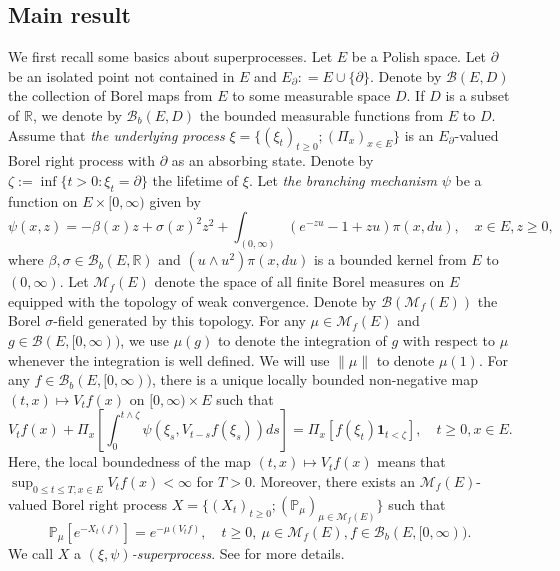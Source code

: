 \documentclass[12pt,a4paper]{amsart}
\numberwithin{equation}{section}
\theoremstyle{plain}
\theoremstyle{definition}
\theoremstyle{remark}
\begin{document}
\subsection{Main result} \label{sec:super}

	We first recall some basics about superprocesses.
	Let $E$ be a Polish space.
    Let $\partial$ be an isolated point not contained in $E$ and $E_\partial: = E \cup \{\partial\}$.
	Denote by $\mathcal B(E, D)$ the collection of Borel maps  from $E$ to some measurable space $D$.
    If $D$ is a subset of $\mathbb R$, we denote by $\mathcal B_b(E,D)$ the bounded measurable functions from $E$ to $D$.
	Assume that \emph{the underlying process} $\xi = \{(\xi_t)_{t\ge0}; (\Pi_x)_{x\in E}\}$ is an $E_\partial$-valued Borel right process with $\partial$ as an
    absorbing state.
	Denote by $\zeta:=\inf\{t>0: \xi_t=\partial\}$ the lifetime of $\xi$.
	Let \emph{the branching mechanism} $\psi$ be a function on $E \times [0,\infty)$ given by
\begin{equation}
	\psi(x,z)
	= -\beta(x) z + \sigma(x)^2 z^2 + \int_{(0,\infty)} (e^{-zu} -1 + zu) \pi(x,du),
	\quad x\in E, z\geq 0,
\end{equation}
	where $\beta, \sigma \in \mathcal B_b(E,\mathbb R)$ and $(u \wedge u^2) \pi(x,du)$ is a bounded kernel from $E$ to $(0,\infty)$.
	Let $\mathcal M_f(E)$ denote the space of all finite Borel measures on $E$ equipped with the topology of weak convergence.
	Denote by $\mathcal B(\mathcal M_f(E))$ the Borel $\sigma$-field generated by this topology.
	For any $\mu\in\mathcal M_f(E)$ and $g \in \mathcal B(E, [0,\infty))$, we use $\mu(g)$ to
   denote the integration of $g$ with respect to $\mu$ whenever the integration is well defined.
    We will use $\|\mu\|$ to denote $\mu(1)$.
  	For any $f \in \mathcal B_b(E, [0,\infty))$, there is a unique locally bounded non-negative map $(t,x)\mapsto V_tf(x)$ on $[0,\infty) \times E$ such that
\begin{equation} \label{eq:BGD.1}
	V_tf(x) + \Pi_x \left[ \int_0^{t\wedge \zeta} \psi \left(\xi_s, V_{t-s}f(\xi_s)\right) ds\right]
	= \Pi_x\left[ f(\xi_t)  \mathbf 1_{t < \zeta}\right], \quad t\geq 0, x\in E.
\end{equation}
	Here, the local boundedness of the map $(t,x) \mapsto V_tf(x)$ means that $\sup_{0\leq t\leq T, x\in E} V_tf(x)< \infty$ for $T >0$.
	Moreover, there exists an $\mathcal M_f(E)$-valued Borel right process $X =\{(X_t)_{t\geq 0}; (\mathbb P_\mu)_{\mu \in \mathcal M_f(E)}\}$ such that
\begin{equation}
	\mathbb P_\mu[e^{- X_t(f)}]
	= e^{- \mu(V_tf)},
	\quad t\geq 0,~\mu \in \mathcal M_f(E), f \in \mathcal B_b(E,[0,\infty)).
\end{equation}
	We call $X$ a \emph{$(\xi, \psi)$-superprocess}.
	See \cite{Li2011MeasureValued} for more details.
\end{document}
